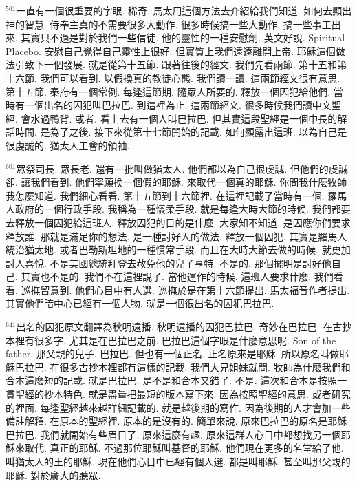 \documentclass{book}
\begin{document}
$^{561}$一直有一個很重要的字眼.
稀奇.
馬太用這個方法去介紹給我們知道.
如何去顯出神的智慧.
侍奉主真的不需要很多大動作.
很多時候搞一些大動作.
搞一些事工出來.
其實只不過是對於我們一些信徒.
他的靈性的一種安慰劑.
英文好說.
Spiritual Placebo.
安慰自己覺得自己靈性上很好.
但實質上我們遠遠離開上帝.
耶穌這個做法引致下一個發展.
就是從第十五節.
跟著往後的經文.
我們先看兩節.
第十五和第十六節.
我們可以看到.
以假換真的教徒心態.
我們讀一讀.
這兩節經文很有意思.
第十五節.
秦府有一個常例.
每逢這節期.
隨眾人所要的.
釋放一個囚犯給他們.
當時有一個出名的囚犯叫巴拉巴.
到這裡為止.
這兩節經文.
很多時候我們讀中文聖經.
會水過鴨背.
或者.
看上去有一個人叫巴拉巴.
但其實這段聖經是一個中長的解話時間.
是為了之後.
接下來從第十七節開始的記載.
如何顯露出這班.
以為自己是很虔誠的.
猶太人工會的領袖.

$^{601}$眾祭司長.
眾長老.
還有一批叫做猶太人.
他們都以為自己很虔誠.
但他們的虔誠卻.
讓我們看到.
他們寧願換一個假的耶穌.
來取代一個真的耶穌.
你問我什麼牧師我怎麼知道.
我們細心看看.
第十五節到十六節裡.
在這裡記載了當時有一個.
羅馬人政府的一個行政手段.
我稱為一種懷柔手段.
就是每逢大時大節的時候.
我們都要去釋放一個囚犯給這班人.
釋放囚犯的目的是什麼.
大家知不知道.
是因應你們要求釋放誰.
那就是滿足你的想法.
是一種討好人的做法.
釋放一個囚犯.
其實是羅馬人統治猶太地.
或者巴勒斯坦地的一種慣常手段.
而且在大時大節去做的時候.
就更加討人喜悅.
不是美國總統拜登去赦免他的兒子亨特.
不是的.
那個擺明是討好他自己.
其實也不是的.
我們不在這裡說了.
當他運作的時候.
這班人要求什麼.
我們看看.
巡撫留意到.
他們心目中有人選.
巡撫於是在第十六節提出.
馬太福音作者提出.
其實他們暗中心已經有一個人物.
就是一個很出名的囚犯巴拉巴.

$^{641}$出名的囚犯原文翻譯為秋明遠播.
秋明遠播的囚犯巴拉巴.
奇妙在巴拉巴.
在古抄本裡有很多字.
尤其是在巴拉巴之前.
巴拉巴這個字眼是什麼意思呢.
Son of the father.
那父親的兒子.
巴拉巴.
但也有一個正名.
正名原來是耶穌.
所以原名叫做耶穌巴拉巴.
在很多古抄本裡都有這樣的記載.
我們大兄姐妹就問.
牧師為什麼我們和合本這麼短的記載.
就是巴拉巴.
是不是和合本又錯了.
不是.
這次和合本是按照一貫聖經的抄本特色.
就是盡量把最短的版本寫下來.
因為按照聖經的意思.
或者研究的裡面.
每逢聖經越來越詳細記載的.
就是越後期的寫作.
因為後期的人才會加一些備註解釋.
在原本的聖經裡.
原本的是沒有的.
簡單來說.
原來巴拉巴的原名是耶穌巴拉巴.
我們就開始有些眉目了.
原來這麼有趣.
原來這群人心目中都想找另一個耶穌來取代.
真正的耶穌.
不過那位耶穌叫基督的耶穌.
他們現在更多的名堂給了他.
叫猶太人的王的耶穌.
現在他們心目中已經有個人選.
都是叫耶穌.
甚至叫那父親的耶穌.
對於廣大的聽眾.
\end{document}
